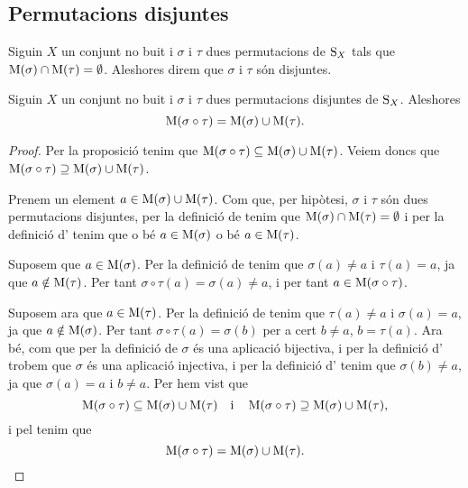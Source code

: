 \documentclass[../Apunts.tex]{subfiles}
\begin{document}
	\subsection{Permutacions disjuntes}
	\begin{definition}
		\label{def:permutacions disjuntes}
		Siguin \(X\) un conjunt no buit i \(\sigma\) i \(\tau\) dues permutacions de \(\operatorname{S}_{X}\) tals que \(\operatorname{M}(\sigma)\cap\operatorname{M}(\tau)=\emptyset\). Aleshores direm que \(\sigma\) i \(\tau\) són disjuntes.
	\end{definition}
	\begin{proposition}
		\label{prop:mou de permutacions conjugades és unió dels mous de les permutacions}
		Siguin \(X\) un conjunt no buit i \(\sigma\) i \(\tau\) dues permutacions disjuntes de \(\operatorname{S}_{X}\). Aleshores
		\[\operatorname{M}(\sigma\circ\tau)=\operatorname{M}(\sigma)\cup\operatorname{M}(\tau).\]
		\begin{proof}
			Per la proposició  tenim que \(\operatorname{M}(\sigma\circ\tau)\subseteq\operatorname{M}(\sigma)\cup\operatorname{M}(\tau)\). Veiem doncs que \(\operatorname{M}(\sigma\circ\tau)\supseteq\operatorname{M}(\sigma)\cup\operatorname{M}(\tau)\).
			
			Prenem un element \(a\in\operatorname{M}(\sigma)\cup\operatorname{M}(\tau)\). Com que, per hipòtesi, \(\sigma\) i \(\tau\) són dues permutacions disjuntes, per la definició de  tenim que \(\operatorname{M}(\sigma)\cap\operatorname{M}(\tau)=\emptyset\) i per la definició d' tenim que o bé \(a\in\operatorname{M}(\sigma)\) o bé \(a\in\operatorname{M}(\tau)\).
			
			Suposem que \(a\in\operatorname{M}(\sigma)\). Per la definició de  tenim que \(\sigma(a)\neq a\) i \(\tau(a)=a\), ja que \(a\notin\operatorname{M}(\tau)\). Per tant \(\sigma\circ\tau(a)=\sigma(a)\neq a\), i per tant \(a\in\operatorname{M}(\sigma\circ\tau)\).
			
			Suposem ara que \(a\in\operatorname{M}(\tau)\). Per la definició de  tenim que \(\tau(a)\neq a\) i \(\sigma(a)=a\), ja que \(a\notin\operatorname{M}(\sigma)\). Per tant \(\sigma\circ\tau(a)=\sigma(b)\) per a cert \(b\neq a\), \(b=\tau(a)\). Ara bé, com que per la definició de  \(\sigma\) és una aplicació bijectiva, i per la definició d' trobem que \(\sigma\) és una aplicació injectiva, i per la definició d' tenim que \(\sigma(b)\neq a\), ja que \(\sigma(a)=a\) i \(b\neq a\). Per hem vist que \[\operatorname{M}(\sigma\circ\tau)\subseteq\operatorname{M}(\sigma)\cup\operatorname{M}(\tau)\quad\text{i}\quad\operatorname{M}(\sigma\circ\tau)\supseteq\operatorname{M}(\sigma)\cup\operatorname{M}(\tau),\]
			i pel  tenim que
			\[\operatorname{M}(\sigma\circ\tau)=\operatorname{M}(\sigma)\cup\operatorname{M}(\tau).\qedhere\]
		\end{proof}
	\end{proposition}
\end{document}
